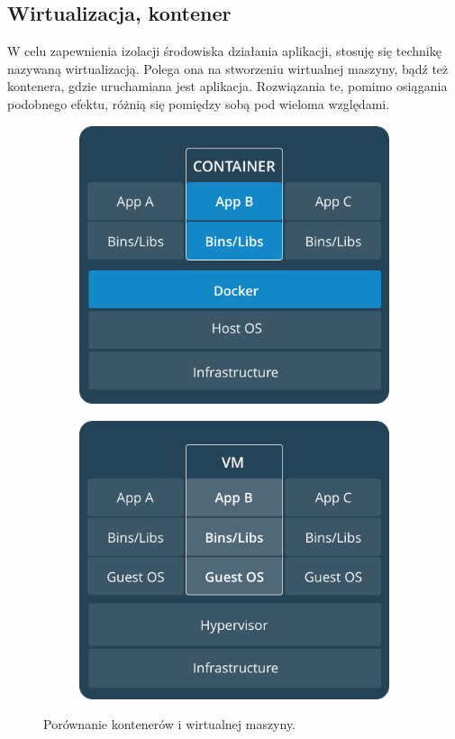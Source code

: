 \documentclass[mgr,oneside]{mgr}
\begin{document}
\subsection{Wirtualizacja, kontener} %
W celu zapewnienia izolacji środowiska działania aplikacji, stosuję się technikę nazywaną wirtualizacją. Polega ona na stworzeniu wirtualnej maszyny, bądź też kontenera, gdzie uruchamiana jest aplikacja. Rozwiązania te, pomimo osiągania podobnego efektu, różnią się pomiędzy sobą pod wieloma względami.

\begin{figure}[h]
  \centering
  \begin{subfigure}{.5\textwidth}
    \centering
    \includegraphics[width=.6\linewidth]{images/docker_container}
    \label{fig:docker_container}
  \end{subfigure}%
  \begin{subfigure}{.5\textwidth}
    \centering
    \includegraphics[width=.6\linewidth]{images/docker_vm}
    \label{fig:docker_vm}
  \end{subfigure}
  \caption{Porównanie kontenerów i wirtualnej maszyny.}
\end{figure}
\end{document}
